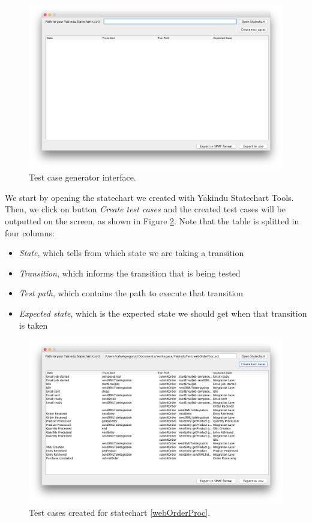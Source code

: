 \begin{figure}[htb]
\centering
\includegraphics[width=\textwidth]{figuras/testGenClean}
\caption{\label{testGenClean} Test case generator interface.}
\end{figure}

We start by opening the statechart we created with Yakindu Statechart Tools. Then, we click on button \textit{Create test cases} and the created test cases will be outputted on the screen, as shown in Figure \ref{testGenResults}. Note that the table is splitted in four columns: 
\begin{itemize}
\item \textit{State}, which tells from which state we are taking a transition
\item \textit{Transition}, which informs the transition that is being tested 
\item \textit{Test path}, which contains the path to execute that transition
\item \textit{Expected state}, which is the expected state we should get when that transition is taken
\end{itemize}

\begin{figure}[htb]
\centering
\includegraphics[width=\textwidth]{figuras/testGenResults}
\caption{\label{testGenResults} Test cases created for statechart \ref{webOrderProc}.}
\end{figure}

